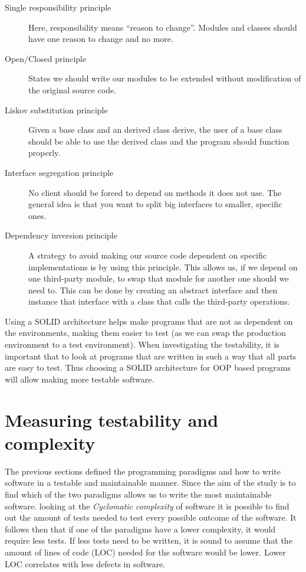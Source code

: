 \begin{description}
    \item [Single responsibility principle] Here, responsibility means ``reason
        to change''. Modules and classes should have one reason to change and no
        more.
    \item [Open/Closed principle] States we should write our modules to be
        extended without modification of the original source code.
    \item [Liskov substitution principle] Given a base class and an derived
        class derive, the user of a base class should be able to use the derived
        class and the program should function properly.
    \item [Interface segregation principle] No client should be forced to depend
        on methods it does not use. The general idea is that you want to split
        big interfaces to smaller, specific ones.
    \item [Dependency inversion principle] A strategy to avoid making our source
        code dependent on specific implementations is by using this principle.
        This allows us, if we depend on one third-party module, to swap that
        module for another one should we need to. This can be done by creating
        an abstract interface and then instance that interface with a class that
        calls the third-party operations.~\cite{martinrobert}
\end{description}

Using a SOLID architecture helps make programs that are not as dependent on the
environments, making them easier to test (as we can swap the production
environment to a test environment). When investigating the testability, it is
important that to look at programs that are written in such a way that all parts
are easy to test. Thus choosing a SOLID architecture for OOP based programs will
allow making more testable software.

\section{Measuring testability and complexity}\label{measuretestability}

The previous sections defined the programming paradigms and how to write
software in a testable and maintainable manner. Since the aim of the study is to
find which of the two paradigms allows us to write the most maintainable
software. looking at the \textit{Cyclomatic complexity} of software it is
possible to find out the amount of tests needed to test every possible outcome
of the software. It follows then that if one of the paradigms have a lower
complexity, it would require less tests. If less tests need to be written, it is
sound to assume that the amount of lines of code (LOC) needed for the software
would be lower. Lower LOC correlates with less defects in
software.~\cite{defectloc} 

